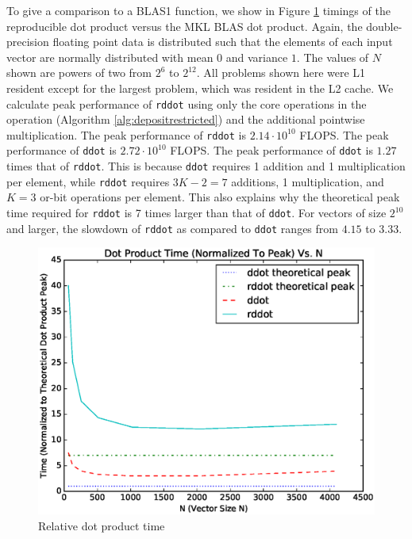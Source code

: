     To give a comparison to a BLAS1 function, we show in Figure \ref{fig:dot_timings} timings of the reproducible dot product versus the MKL BLAS dot product. Again, the double-precision floating point data is distributed such that the elements of each input vector are normally distributed with mean $0$ and variance $1$. The values of $N$ shown are powers of two from $2^6$ to $2^{12}$. All problems shown here were L1 resident except for the largest problem, which was resident in the L2 cache. We calculate peak performance of \texttt{rddot} using only the core operations in the  operation (Algorithm \ref{alg:depositrestricted}) and the additional pointwise multiplication. The peak performance of \texttt{rddot} is $2.14\cdot 10^{10}$ FLOPS. The peak performance of \texttt{ddot} is $2.72\cdot 10^{10}$ FLOPS. The peak performance of \texttt{ddot} is $1.27$ times that of \texttt{rddot}. This is because \texttt{ddot} requires 1 addition and 1 multiplication per element, while \texttt{rddot} requires $3K - 2 = 7$ additions, 1 multiplication, and $K = 3$ or-bit operations per element. This also explains why the theoretical peak time required for \texttt{rddot} is 7 times larger than that of \texttt{ddot}. For vectors of size $2^{10}$ and larger, the slowdown of \texttt{rddot} as compared to \texttt{ddot} ranges from $4.15$ to $3.33$.
  \begin{figure}[H]
  \begin{center}
  \includegraphics[width=\textwidth]{plots/dot_comparison}
  \caption{Relative dot product time}
  \label{fig:dot_timings}
  \end{center}
  \end{figure}
